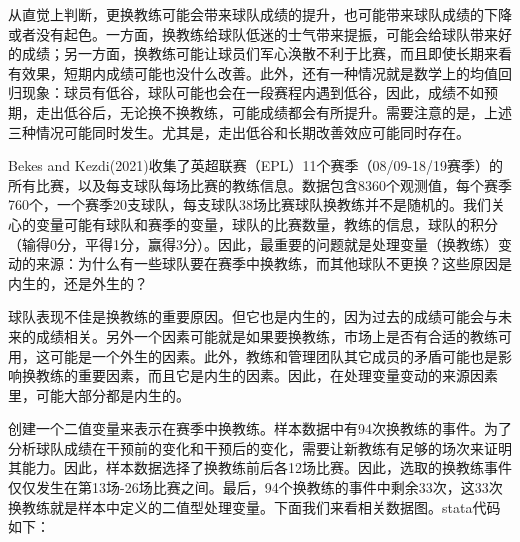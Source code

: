 \documentclass[cn,12pt,math=newtx,citestyle=gb7714-2015,bibstyle=gb7714-2015]{elegantbook}
\begin{document}
	    从直觉上判断，更换教练可能会带来球队成绩的提升，也可能带来球队成绩的下降或者没有起色。一方面，换教练给球队低迷的士气带来提振，可能会给球队带来好的成绩；另一方面，换教练可能让球员们军心涣散不利于比赛，而且即使长期来看有效果，短期内成绩可能也没什么改善。此外，还有一种情况就是数学上的均值回归现象：球员有低谷，球队可能也会在一段赛程内遇到低谷，因此，成绩不如预期，走出低谷后，无论换不换教练，可能成绩都会有所提升。需要注意的是，上述三种情况可能同时发生。尤其是，走出低谷和长期改善效应可能同时存在。
	    
	    Bekes and Kezdi(2021)收集了英超联赛（EPL）11个赛季（08/09-18/19赛季）的所有比赛，以及每支球队每场比赛的教练信息。数据包含8360个观测值，每个赛季760个，一个赛季20支球队，每支球队38场比赛球队换教练并不是随机的。我们关心的变量可能有球队和赛季的变量，球队的比赛数量，教练的信息，球队的积分（输得0分，平得1分，赢得3分）。因此，最重要的问题就是处理变量（换教练）变动的来源：为什么有一些球队要在赛季中换教练，而其他球队不更换？这些原因是内生的，还是外生的？
	    
	    球队表现不佳是换教练的重要原因。但它也是内生的，因为过去的成绩可能会与未来的成绩相关。另外一个因素可能就是如果要换教练，市场上是否有合适的教练可用，这可能是一个外生的因素。此外，教练和管理团队其它成员的矛盾可能也是影响换教练的重要因素，而且它是内生的因素。因此，在处理变量变动的来源因素里，可能大部分都是内生的。
	    
	    创建一个二值变量来表示在赛季中换教练。样本数据中有94次换教练的事件。为了分析球队成绩在干预前的变化和干预后的变化，需要让新教练有足够的场次来证明其能力。因此，样本数据选择了换教练前后各12场比赛。因此，选取的换教练事件仅仅发生在第13场-26场比赛之间。最后，94个换教练的事件中剩余33次，这33次换教练就是样本中定义的二值型处理变量。下面我们来看相关数据图。stata代码如下：
	    
\end{document}
